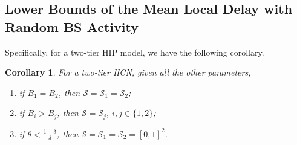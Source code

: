 \documentclass[12pt,draftclsnofoot,journal,onecolumn]{IEEEtran}
\newtheorem{corollary}{Corollary}
\begin{document}
\subsection{Lower Bounds of the Mean Local Delay with Random BS Activity}
Specifically, for a two-tier HIP model, we have the following corollary.
\begin{corollary}\label{cor:2tierProbBound}
	For a two-tier HCN, given all the other parameters,
	\begin{enumerate}[(1)]
		\item if $B_1=B_2$, then $\mathcal{S}=\mathcal{S}_1 = \mathcal{S}_2$;
		\item if $B_i>B_j$, then $\mathcal{S}=\mathcal{S}_j$, $i,j\in\{1,2\}$;
		\item if $\theta < \frac{1-\delta}{\delta}$, then $\mathcal{S}=\mathcal{S}_1 = \mathcal{S}_2=[0,1]^2$.
	\end{enumerate}
\end{corollary}
\end{document}
